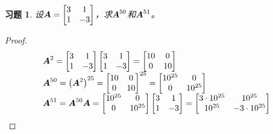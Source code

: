 \documentclass{ctexart}
\newtheorem{problem}{习题}[section]
\begin{document}
\begin{problem}
设\(\boldsymbol{A}=\begin{bmatrix}3&1\\1&-3\end{bmatrix}\)，求\(\boldsymbol{A}^{50}\)和\(\boldsymbol{A}^{51}\)。
\end{problem}
\begin{proof}
    \begin{equation*}
        \begin{array}{lll}
            \boldsymbol{A}^2=\begin{bmatrix}3&1\\1&-3\end{bmatrix}\begin{bmatrix}3&1\\1&-3\end{bmatrix}=\begin{bmatrix}10&0\\0&10\end{bmatrix}      \\
            \boldsymbol{A}^{50}=\left( \boldsymbol{A}^2 \right)^{25}={\begin{bmatrix}10&0\\0&10\end{bmatrix}}^{25}=\begin{bmatrix}10^{25}&0\\0&10^{25}\end{bmatrix} \\
            \boldsymbol{A}^{51}=\boldsymbol{A}^{50}\boldsymbol{A}=\begin{bmatrix}10^{25}&0\\0&10^{25}\end{bmatrix}\begin{bmatrix}3&1\\1&-3\end{bmatrix}=\begin{bmatrix}3\cdot10^{25}&10^{25}\\10^{25}&-3\cdot10^{25}\end{bmatrix}
        \end{array}
    \end{equation*}
\end{proof}
\end{document}
